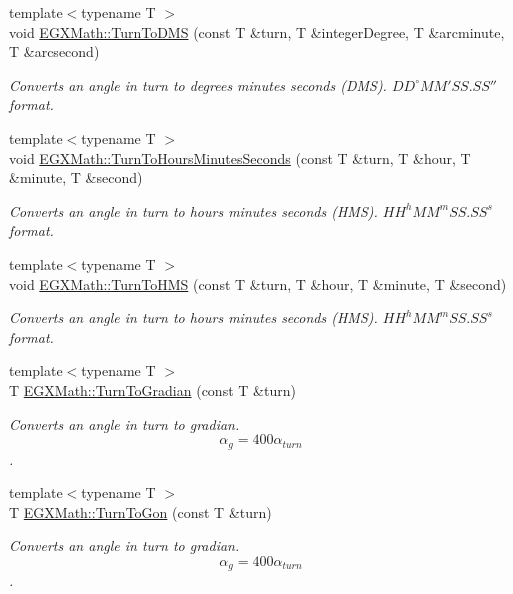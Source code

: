 \begin{DoxyCompactItemize}
{\footnotesize template$<$typename T $>$ }\\void \mbox{\hyperlink{group___e_g_x_math-_angle_conversions-_turn_ga6ca011c0ae55ae079402080d7a1b4010}{E\+G\+X\+Math\+::\+Turn\+To\+D\+MS}} (const T \&turn, T \&integer\+Degree, T \&arcminute, T \&arcsecond)
\begin{DoxyCompactList}\small\item\em Converts an angle in turn to degrees minutes seconds (D\+MS). ${DD}^{\circ}{MM}'{SS.SS}''$ format. \end{DoxyCompactList}\item 
{\footnotesize template$<$typename T $>$ }\\void \mbox{\hyperlink{group___e_g_x_math-_angle_conversions-_turn_ga0bc017b3314253352ddec728d3f6b76a}{E\+G\+X\+Math\+::\+Turn\+To\+Hours\+Minutes\+Seconds}} (const T \&turn, T \&hour, T \&minute, T \&second)
\begin{DoxyCompactList}\small\item\em Converts an angle in turn to hours minutes seconds (H\+MS). ${HH}^h{MM}^m{SS.SS}^s$ format. \end{DoxyCompactList}\item 
{\footnotesize template$<$typename T $>$ }\\void \mbox{\hyperlink{group___e_g_x_math-_angle_conversions-_turn_ga74efaece2f95aa6671f18382e5f3925f}{E\+G\+X\+Math\+::\+Turn\+To\+H\+MS}} (const T \&turn, T \&hour, T \&minute, T \&second)
\begin{DoxyCompactList}\small\item\em Converts an angle in turn to hours minutes seconds (H\+MS). ${HH}^h{MM}^m{SS.SS}^s$ format. \end{DoxyCompactList}\item 
{\footnotesize template$<$typename T $>$ }\\T \mbox{\hyperlink{group___e_g_x_math-_angle_conversions-_turn_gad6aa9bdde2cde17cec136b24ee017bba}{E\+G\+X\+Math\+::\+Turn\+To\+Gradian}} (const T \&turn)
\begin{DoxyCompactList}\small\item\em Converts an angle in turn to gradian. \[\alpha_{g}=400\alpha_{turn}\]. \end{DoxyCompactList}\item 
{\footnotesize template$<$typename T $>$ }\\T \mbox{\hyperlink{group___e_g_x_math-_angle_conversions-_turn_gad81dd0bb1660ef24e28fa15b2403dec7}{E\+G\+X\+Math\+::\+Turn\+To\+Gon}} (const T \&turn)
\begin{DoxyCompactList}\small\item\em Converts an angle in turn to gradian. \[\alpha_{g}=400\alpha_{turn}\]. \end{DoxyCompactList}\item 

\end{DoxyCompactItemize}
